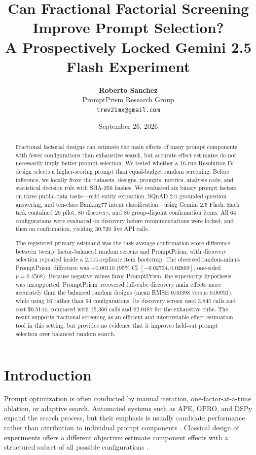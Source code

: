 \documentclass[11pt,a4paper]{article}
\title{\textbf{Can Fractional Factorial Screening Improve Prompt Selection?}\\
\large A Prospectively Locked Gemini 2.5 Flash Experiment}
\author{\textbf{Roberto Sanchez}\\PromptPrism Research Group\\\texttt{trev21mx@gmail.com}}
\date{September 26, 2026}
\newcommand{\method}{PromptPrism}
\begin{document}
\setlength{\emergencystretch}{3em}
\maketitle

\begin{abstract}
Fractional factorial designs can estimate the main effects of many prompt components with fewer configurations than exhaustive search, but accurate effect estimates do not necessarily imply better prompt selection. We tested whether a 16-run Resolution IV design selects a higher-scoring prompt than equal-budget random screening. Before inference, we locally froze the datasets, designs, prompts, metrics, analysis code, and statistical decision rule with SHA-256 hashes. We evaluated six binary prompt factors on three public-data tasks---re3d entity extraction, SQuAD 2.0 grounded question answering, and ten-class Banking77 intent classification---using Gemini 2.5 Flash. Each task contained 20 pilot, 80 discovery, and 80 group-disjoint confirmation items. All 64 configurations were evaluated on discovery before recommendations were locked, and then on confirmation, yielding 30,720 live API calls.

The registered primary estimand was the task-average confirmation-score difference between twenty factor-balanced random screens and \method, with discovery selection repeated inside a 2,000-replicate item bootstrap. The observed random-minus-\method\ difference was $+0.00110$ (95\% CI $[-0.02734, 0.02869]$; one-sided $p=0.4568$). Because negative values favor \method, the superiority hypothesis was unsupported. \method\ recovered full-cube discovery main effects more accurately than the balanced random designs (mean RMSE $0.00398$ versus $0.00931$), while using 16 rather than 64 configurations. Its discovery screen used 3,840 calls and cost \$0.5144, compared with 15,360 calls and \$2.0487 for the exhaustive cube. The result supports fractional screening as an efficient and interpretable effect-estimation tool in this setting, but provides no evidence that it improves held-out prompt selection over balanced random search.
\end{abstract}

\section{Introduction}
Prompt optimization is often conducted by manual iteration, one-factor-at-a-time ablation, or adaptive search. Automated systems such as APE, OPRO, and DSPy expand the search process, but their emphasis is usually candidate performance rather than attribution to individual prompt components \citep{zhou2023large,yang2023large,khattab2024dspy}. Classical design of experiments offers a different objective: estimate component effects with a structured subset of all possible configurations \citep{box2005statistics,montgomery2017design}.
\end{document}
